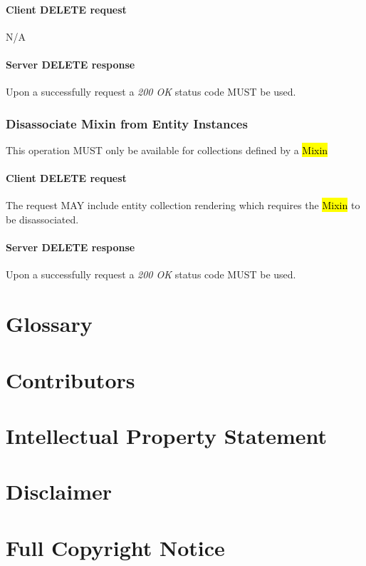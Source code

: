 \documentclass[10pt,a4paper]{article}
\begin{document}
\paragraph{Client DELETE request}
N/A

\paragraph{Server DELETE response}
Upon a successfully request a \emph{200 OK} status code MUST be used.

\subsubsection{Disassociate Mixin from Entity Instances}
This operation MUST only be available for collections defined by a \hl{Mixin}

\paragraph{Client DELETE request}
The request MAY include entity collection rendering which requires the \hl{Mixin} to be disassociated.

\paragraph{Server DELETE response}
Upon a successfully request a \emph{200 OK} status code MUST be used.

\section{Glossary}
\label{sec:glossary}


\section{Contributors}


\section{Intellectual Property Statement}


\section{Disclaimer}


\section{Full Copyright Notice}




\end{document}
